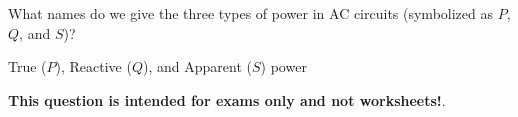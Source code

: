 

What names do we give the three types of power in AC circuits (symbolized as $P$, $Q$, and $S$)?







True ($P$), Reactive ($Q$), and Apparent ($S$) power







{\bf This question is intended for exams only and not worksheets!}.



